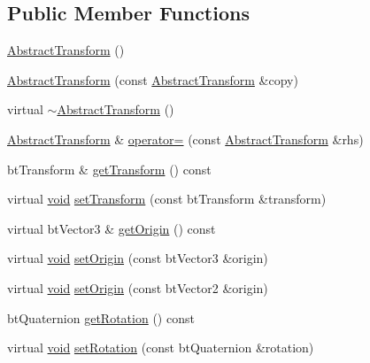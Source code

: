 \subsection*{Public Member Functions}
\begin{DoxyCompactItemize}
\item 
\mbox{\hyperlink{classnjli_1_1_abstract_transform_ae81766ce7baa95743ad256dfab13a086}{Abstract\+Transform}} ()
\item 
\mbox{\hyperlink{classnjli_1_1_abstract_transform_a8ea40aa6d85fc58ddec0962568921ddc}{Abstract\+Transform}} (const \mbox{\hyperlink{classnjli_1_1_abstract_transform}{Abstract\+Transform}} \&copy)
\item 
virtual \mbox{\hyperlink{classnjli_1_1_abstract_transform_a0e9a40091685470285419f35c6c91bcc}{$\sim$\+Abstract\+Transform}} ()
\item 
\mbox{\hyperlink{classnjli_1_1_abstract_transform}{Abstract\+Transform}} \& \mbox{\hyperlink{classnjli_1_1_abstract_transform_a33740ec533c3328faff5d702bcd36a16}{operator=}} (const \mbox{\hyperlink{classnjli_1_1_abstract_transform}{Abstract\+Transform}} \&rhs)
\item 
bt\+Transform \& \mbox{\hyperlink{classnjli_1_1_abstract_transform_a6341254e626b209df85d0b7e830c2894}{get\+Transform}} () const
\item 
virtual \mbox{\hyperlink{_thread_8h_af1e856da2e658414cb2456cb6f7ebc66}{void}} \mbox{\hyperlink{classnjli_1_1_abstract_transform_a87650e2ff117cde3128c9de164c84b2b}{set\+Transform}} (const bt\+Transform \&transform)
\item 
virtual bt\+Vector3 \& \mbox{\hyperlink{classnjli_1_1_abstract_transform_a8ed6d7cc1b5728f68a2455e918a8c6b5}{get\+Origin}} () const
\item 
virtual \mbox{\hyperlink{_thread_8h_af1e856da2e658414cb2456cb6f7ebc66}{void}} \mbox{\hyperlink{classnjli_1_1_abstract_transform_a8dfc3a81836971418bb9c71004222c8f}{set\+Origin}} (const bt\+Vector3 \&origin)
\item 
virtual \mbox{\hyperlink{_thread_8h_af1e856da2e658414cb2456cb6f7ebc66}{void}} \mbox{\hyperlink{classnjli_1_1_abstract_transform_a82759647e299853f562331879818eaa7}{set\+Origin}} (const bt\+Vector2 \&origin)
\item 
bt\+Quaternion \mbox{\hyperlink{classnjli_1_1_abstract_transform_ab998267bb4662fa0c3902b9a236f15fc}{get\+Rotation}} () const
\item 
virtual \mbox{\hyperlink{_thread_8h_af1e856da2e658414cb2456cb6f7ebc66}{void}} \mbox{\hyperlink{classnjli_1_1_abstract_transform_a721ce04e176c7bdd5fea612ccbbd1e12}{set\+Rotation}} (const bt\+Quaternion \&rotation)

\end{DoxyCompactItemize}
